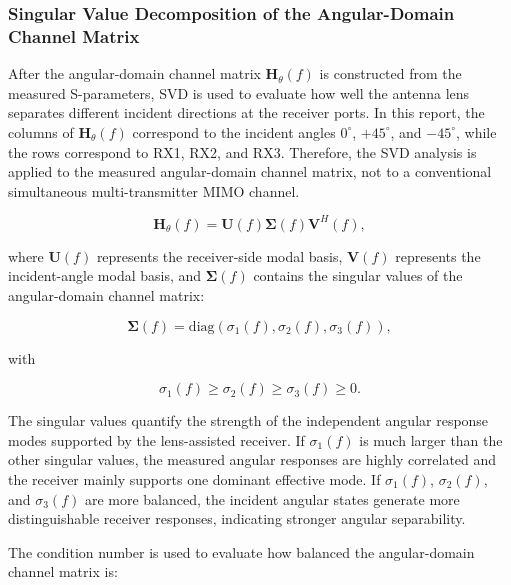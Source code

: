 \documentclass[10pt]{article}
\begin{document}
\subsubsection{Singular Value Decomposition of the Angular-Domain Channel Matrix}

After the angular-domain channel matrix \(\mathbf{H}_{\theta}(f)\) is constructed from the measured
S-parameters, SVD is used to evaluate how well the antenna lens separates different incident
directions at the receiver ports. In this report, the columns of \(\mathbf{H}_{\theta}(f)\) correspond
to the incident angles \(0^\circ\), \(+45^\circ\), and \(-45^\circ\), while the rows correspond to
RX1, RX2, and RX3. Therefore, the SVD analysis is applied to the measured angular-domain channel
matrix, not to a conventional simultaneous multi-transmitter MIMO channel.

\begin{equation}
\mathbf{H}_{\theta}(f)
=
\mathbf{U}(f)\boldsymbol{\Sigma}(f)\mathbf{V}^{H}(f),
\label{eq:svd_angular_channel}
\end{equation}

where \(\mathbf{U}(f)\) represents the receiver-side modal basis, \(\mathbf{V}(f)\) represents the
incident-angle modal basis, and \(\boldsymbol{\Sigma}(f)\) contains the singular values of the
angular-domain channel matrix:

\begin{equation}
\boldsymbol{\Sigma}(f)
=
\mathrm{diag}
\left(
\sigma_1(f),
\sigma_2(f),
\sigma_3(f)
\right),
\label{eq:svd_sigma}
\end{equation}

with

\begin{equation}
\sigma_1(f)\geq\sigma_2(f)\geq\sigma_3(f)\geq 0.
\label{eq:singular_value_order}
\end{equation}

The singular values quantify the strength of the independent angular response modes supported by
the lens-assisted receiver. If \(\sigma_1(f)\) is much larger than the other singular values, the
measured angular responses are highly correlated and the receiver mainly supports one dominant
effective mode. If \(\sigma_1(f)\), \(\sigma_2(f)\), and \(\sigma_3(f)\) are more balanced, the
incident angular states generate more distinguishable receiver responses, indicating stronger
angular separability.

The condition number is used to evaluate how balanced the angular-domain channel matrix is:
\end{document}
